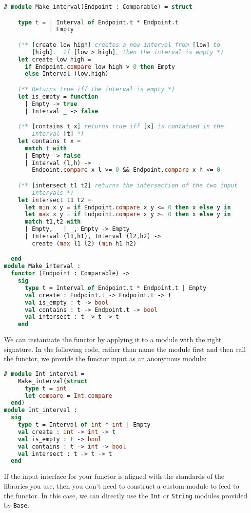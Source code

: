 \begin{lstlisting}[language=Caml]
# module Make_interval(Endpoint : Comparable) = struct

    type t = | Interval of Endpoint.t * Endpoint.t
             | Empty

    (** [create low high] creates a new interval from [low] to
        [high].  If [low > high], then the interval is empty *)
    let create low high =
      if Endpoint.compare low high > 0 then Empty
      else Interval (low,high)

    (** Returns true iff the interval is empty *)
    let is_empty = function
      | Empty -> true
      | Interval _ -> false

    (** [contains t x] returns true iff [x] is contained in the
        interval [t] *)
    let contains t x =
      match t with
      | Empty -> false
      | Interval (l,h) ->
        Endpoint.compare x l >= 0 && Endpoint.compare x h <= 0

    (** [intersect t1 t2] returns the intersection of the two input
        intervals *)
    let intersect t1 t2 =
      let min x y = if Endpoint.compare x y <= 0 then x else y in
      let max x y = if Endpoint.compare x y >= 0 then x else y in
      match t1,t2 with
      | Empty, _ | _, Empty -> Empty
      | Interval (l1,h1), Interval (l2,h2) ->
        create (max l1 l2) (min h1 h2)

  end
module Make_interval :
  functor (Endpoint : Comparable) ->
    sig
      type t = Interval of Endpoint.t * Endpoint.t | Empty
      val create : Endpoint.t -> Endpoint.t -> t
      val is_empty : t -> bool
      val contains : t -> Endpoint.t -> bool
      val intersect : t -> t -> t
    end
\end{lstlisting}

We can instantiate the functor by applying it to a module with the right
signature. In the following code, rather than name the module first and
then call the functor, we provide the functor input as an anonymous
module:

\begin{lstlisting}[language=Caml]
# module Int_interval =
    Make_interval(struct
      type t = int
      let compare = Int.compare
  end)
module Int_interval :
  sig
    type t = Interval of int * int | Empty
    val create : int -> int -> t
    val is_empty : t -> bool
    val contains : t -> int -> bool
    val intersect : t -> t -> t
  end
\end{lstlisting}

If the input interface for your functor is aligned with the standards of
the libraries you use, then you don't need to construct a custom module
to feed to the functor. In this case, we can directly use the
\passthrough{\lstinline!Int!} or \passthrough{\lstinline!String!}
modules provided by \passthrough{\lstinline!Base!}:

